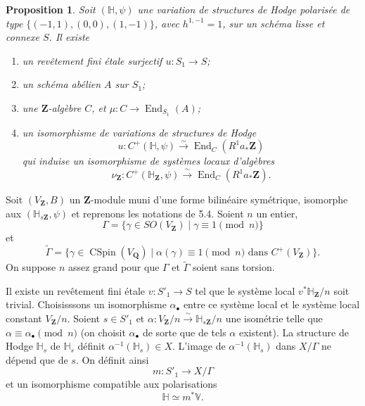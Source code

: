 \documentclass[11pt]{amsart}
\theoremstyle{plain}
\newtheorem{proposition}[theoreme]{Proposition}
\theoremstyle{definition}
\theoremstyle{remark}
\begin{document}
\begin{proposition}\label{prop:5.7}
Soit $(\mathbb{H},\psi)$ une variation de structures de Hodge polaris\'ee de type $\{(-1,1),(0,0),(1,-1)\}$, avec $h^{1,-1}=1$, sur un sch\'ema lisse et connexe $S$. Il existe
\begin{enumerate}
\item[a)] un rev\^etement fini \'etale surjectif $u\colon S_1\to S$;
\item[b)] un sch\'ema ab\'elien $A$ sur $S_1$;
\item[c)] une $\mathbf{Z}$-alg\`ebre $C$, et $\mu\colon C\to\operatorname{End}_{S_1}(A)$;
\item[d)] un isomorphisme de variations de structures de Hodge
\begin{equation*}
u\colon C^+(\mathbb{H},\psi)\xrightarrow{\sim}\operatorname{End}_C(R^1a_*\mathbf{Z})
\end{equation*}
qui induise un isomorphisme de syst\`emes locaux d'alg\`ebres
\begin{equation*}
\nu_\mathbf{Z}\colon C^+(\mathbb{H}_\mathbf{Z},\psi)\xrightarrow{\sim}\operatorname{End}_C(R^1a_*\mathbf{Z}).
\end{equation*}
\end{enumerate}
\end{proposition}

Soit $(V_\mathbf{Z},B)$ un $\mathbf{Z}$-module muni d'une forme bilin\'eaire sym\'etrique, isomorphe aux $(\mathbb{H}_{s\mathbf{Z}},\psi)$ et reprenons les notations de 5.4. Soient $n$ un entier,
\begin{equation*}
\Gamma=\{\gamma\in SO(V_\mathbf{Z})\mid \gamma\equiv 1\pmod{n}\}
\end{equation*}
et
\begin{equation*}
\tilde{\Gamma}=\{\gamma\in\operatorname{CSpin}(V_\mathbf{Q})\mid \alpha(\gamma)\equiv 1\pmod{n}\text{ dans }C^+(V_\mathbf{Z})\}.
\end{equation*}
On suppose $n$ assez grand pour que $\Gamma$ et $\tilde{\Gamma}$ soient sans torsion.

Il existe un rev\^etement fini \'etale $v\colon S'_1\to S$ tel que le syst\`eme local $v^*\mathbb{H}_\mathbf{Z}/n$ soit trivial. Choisisssons un isomorphisme $\alpha_\bullet$ entre ce syst\`eme local et le syst\`eme local constant $V_\mathbf{Z}/n$. Soient $s\in S'_1$ et $\alpha\colon V_\mathbf{Z}/n\xrightarrow{\sim}\mathbb{H}_{s\mathbf{Z}}/n$ une isom\'etrie telle que $\alpha\equiv\alpha_\bullet\pmod n$ (on choisit $\alpha_\bullet$ de sorte que de tels $\alpha$ existent). La structure de Hodge $\mathbb{H}_s$ de $\mathbb{H}_s$ d\'efinit $\alpha^{-1}(\mathbb{H}_s)\in X$. L'image de $\alpha^{-1}(\mathbb{H}_s)$ dans $X/\Gamma$ ne d\'epend que de $s$. On d\'efinit ainsi
\begin{equation*}
m\colon S'_1\to X/\Gamma
\end{equation*}
et un isomorphisme compatible aux polarisations
\begin{equation*}
\mathbb{H}\simeq m^*\mathbb{V}.
\end{equation*}
\end{document}
